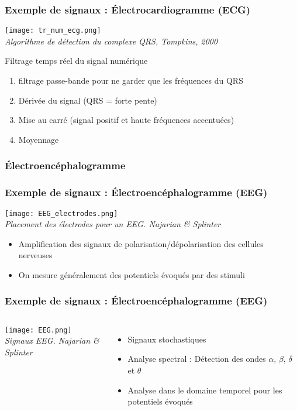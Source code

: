 \documentclass{beamer}
\begin{document}
\begin{frame}
\frametitle{Exemple de signaux : \'Electrocardiogramme (ECG)}
\begin{center}
\texttt{[image: tr\_num\_ecg.png]}\\
\textit{\footnotesize Algorithme de détection du complexe QRS, Tompkins, 2000}\\
\end{center}
Filtrage temps réel du signal numérique
\begin{enumerate}
\item<2-> filtrage passe-bande pour ne garder que les fréquences du QRS
\item<3-> Dérivée du signal (QRS = forte pente)
\item<4-> Mise au carré (signal positif et haute fréquences accentuées)
\item<5-> Moyennage
\end{enumerate}
\end{frame}

\subsubsection{\'Electroencéphalogramme}
\begin{frame}
\frametitle{Exemple de signaux : \'Electroencéphalogramme (EEG)}
\begin{center}
\texttt{[image: EEG\_electrodes.png]}\\
\textit{\footnotesize Placement des électrodes pour un EEG. Najarian \& Splinter}
\end{center}
\vspace{0.2cm}
\begin{itemize}
\item Amplification des signaux de polarisation/dépolarisation des cellules nerveuses
\item On mesure généralement des potentiels évoqués par des stimuli
\end{itemize}

\end{frame}

\begin{frame}
\frametitle{Exemple de signaux : \'Electroencéphalogramme (EEG)}
\begin{columns}
\column{60mm}
\texttt{[image: EEG.png]}\\
\textit{\footnotesize Signaux EEG. Najarian \& Splinter}
\column{60mm}
\begin{itemize}
\item Signaux stochastiques 
\vspace{0.2cm}
\item Analyse spectral : Détection des ondes $\alpha$, $\beta$, $\delta$ et $\theta$
\vspace{0.2cm}
\item Analyse dans le domaine temporel pour les potentiels évoqués
\end{itemize}
\end{columns}
\end{frame}
\end{document}
